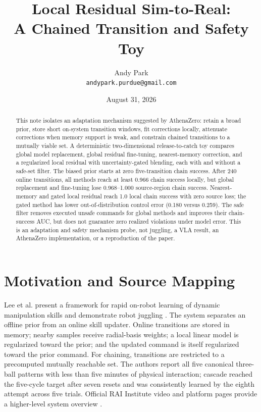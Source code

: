\documentclass[11pt]{article}
\title{Local Residual Sim-to-Real:\\A Chained Transition and Safety Toy}
\author{Andy Park\\\texttt{andypark.purdue@gmail.com}}
\date{August 31, 2026}
\begin{document}
\setlength{\emergencystretch}{3em}
\maketitle

\begin{abstract}
This note isolates an adaptation mechanism suggested by AthenaZero: retain a broad prior, store short on-system transition windows, fit corrections locally, attenuate corrections when memory support is weak, and constrain chained transitions to a mutually viable set. A deterministic two-dimensional release-to-catch toy compares global model replacement, global residual fine-tuning, nearest-memory correction, and a regularized local residual with uncertainty-gated blending, each with and without a safe-set filter. The biased prior starts at zero five-transition chain success. After 240 online transitions, all methods reach at least 0.966 chain success locally, but global replacement and fine-tuning lose 0.968--1.000 source-region chain success. Nearest-memory and gated local residual reach 1.0 local chain success with zero source loss; the gated method has lower out-of-distribution control error (0.180 versus 0.259). The safe filter removes executed unsafe commands for global methods and improves their chain-success AUC, but does not guarantee zero realized violations under model error. This is an adaptation and safety mechanism probe, not juggling, a VLA result, an AthenaZero implementation, or a reproduction of the paper.
\end{abstract}

\section{Motivation and Source Mapping}

Lee et al. present a framework for rapid on-robot learning of dynamic manipulation skills and demonstrate robot juggling \cite{juggling}. The system separates an offline prior from an online skill updater. Online transitions are stored in memory; nearby samples receive radial-basis weights; a local linear model is regularized toward the prior; and the updated command is itself regularized toward the prior command. For chaining, transitions are restricted to a precomputed mutually reachable set. The authors report all five canonical three-ball patterns with less than five minutes of physical interaction; cascade reached the five-cycle target after seven resets and was consistently learned by the eighth attempt across five trials. Official RAI Institute video and platform pages provide a higher-level system overview \cite{video,athenazero}.
\end{document}
